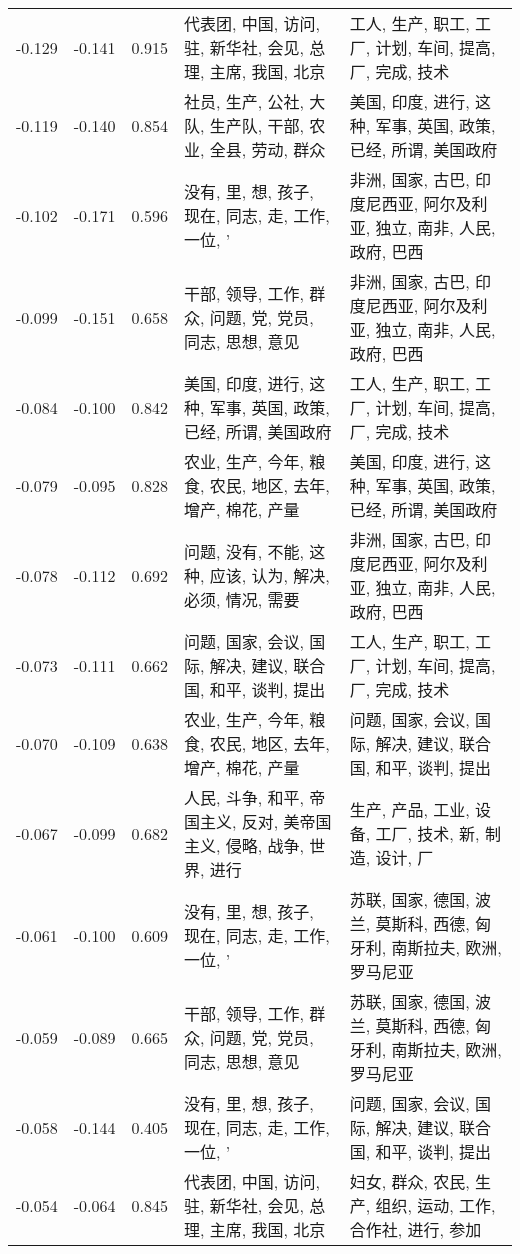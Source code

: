 \begin{tabular}{cccp{5cm}p{5cm}}
-0.129 & -0.141 & 0.915 & 代表团, 中国, 访问, 驻, 新华社, 会见, 总理, 主席, 我国, 北京 & 工人, 生产, 职工, 工厂, 计划, 车间, 提高, 厂, 完成, 技术 \\
-0.119 & -0.140 & 0.854 & 社员, 生产, 公社, 大队, 生产队, 干部, 农业, 全县, 劳动, 群众 & 美国, 印度, 进行, 这种, 军事, 英国, 政策, 已经, 所谓, 美国政府 \\
-0.102 & -0.171 & 0.596 & 没有, 里, 想, 孩子, 现在, 同志, 走, 工作, 一位, ’ & 非洲, 国家, 古巴, 印度尼西亚, 阿尔及利亚, 独立, 南非, 人民, 政府, 巴西 \\
-0.099 & -0.151 & 0.658 & 干部, 领导, 工作, 群众, 问题, 党, 党员, 同志, 思想, 意见 & 非洲, 国家, 古巴, 印度尼西亚, 阿尔及利亚, 独立, 南非, 人民, 政府, 巴西 \\
-0.084 & -0.100 & 0.842 & 美国, 印度, 进行, 这种, 军事, 英国, 政策, 已经, 所谓, 美国政府 & 工人, 生产, 职工, 工厂, 计划, 车间, 提高, 厂, 完成, 技术 \\
-0.079 & -0.095 & 0.828 & 农业, 生产, 今年, 粮食, 农民, 地区, 去年, 增产, 棉花, 产量 & 美国, 印度, 进行, 这种, 军事, 英国, 政策, 已经, 所谓, 美国政府 \\
-0.078 & -0.112 & 0.692 & 问题, 没有, 不能, 这种, 应该, 认为, 解决, 必须, 情况, 需要 & 非洲, 国家, 古巴, 印度尼西亚, 阿尔及利亚, 独立, 南非, 人民, 政府, 巴西 \\
-0.073 & -0.111 & 0.662 & 问题, 国家, 会议, 国际, 解决, 建议, 联合国, 和平, 谈判, 提出 & 工人, 生产, 职工, 工厂, 计划, 车间, 提高, 厂, 完成, 技术 \\
-0.070 & -0.109 & 0.638 & 农业, 生产, 今年, 粮食, 农民, 地区, 去年, 增产, 棉花, 产量 & 问题, 国家, 会议, 国际, 解决, 建议, 联合国, 和平, 谈判, 提出 \\
-0.067 & -0.099 & 0.682 & 人民, 斗争, 和平, 帝国主义, 反对, 美帝国主义, 侵略, 战争, 世界, 进行 & 生产, 产品, 工业, 设备, 工厂, 技术, 新, 制造, 设计, 厂 \\
-0.061 & -0.100 & 0.609 & 没有, 里, 想, 孩子, 现在, 同志, 走, 工作, 一位, ’ & 苏联, 国家, 德国, 波兰, 莫斯科, 西德, 匈牙利, 南斯拉夫, 欧洲, 罗马尼亚 \\
-0.059 & -0.089 & 0.665 & 干部, 领导, 工作, 群众, 问题, 党, 党员, 同志, 思想, 意见 & 苏联, 国家, 德国, 波兰, 莫斯科, 西德, 匈牙利, 南斯拉夫, 欧洲, 罗马尼亚 \\
-0.058 & -0.144 & 0.405 & 没有, 里, 想, 孩子, 现在, 同志, 走, 工作, 一位, ’ & 问题, 国家, 会议, 国际, 解决, 建议, 联合国, 和平, 谈判, 提出 \\
-0.054 & -0.064 & 0.845 & 代表团, 中国, 访问, 驻, 新华社, 会见, 总理, 主席, 我国, 北京 & 妇女, 群众, 农民, 生产, 组织, 运动, 工作, 合作社, 进行, 参加 \\

\end{tabular}
